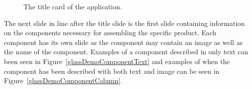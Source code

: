 	
	\begin{figure}[ht!]
		\centering
   		 \qquad
   		 \qquad
		\caption{The title card of the application.}
		\label{glassDemoTitleCard}
	\end{figure}
	
The next slide in line after the title slide is the first slide containing information on the components necessary for assembling the specific product. Each component has its own slide as the component may contain an image as well as the name of the component. Examples of a component described in only text can been seen in Figure~\ref{glassDemoComponentText} and examples of when the component has been described with both text and image can be seen in Figure~\ref{glassDemoComponentColumn}.

